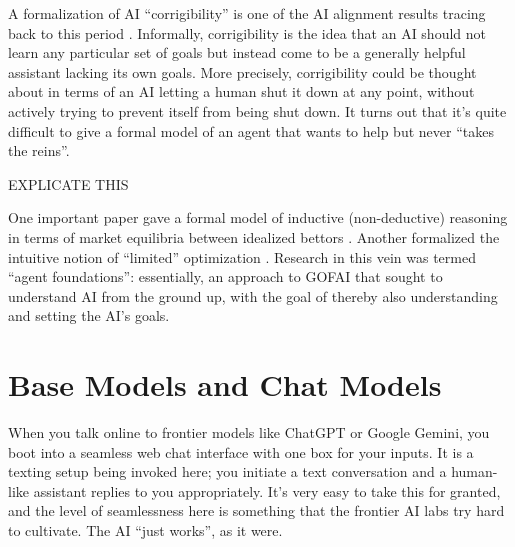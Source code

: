 A formalization of AI ``corrigibility'' is one of the AI alignment results
tracing back to this period \cite{soares2015corrigibility}. Informally,
corrigibility is the idea that an AI should not learn any particular set of
goals but instead come to be a generally helpful assistant lacking its own
goals. More precisely, corrigibility could be thought about in terms of an AI
letting a human shut it down at any point, without actively trying to prevent
itself from being shut down. It turns out that it's quite difficult to give a
formal model of an agent that wants to help but never ``takes the reins''.

EXPLICATE THIS

One important paper gave a formal model of inductive (non-deductive) reasoning
in terms of market equilibria between idealized bettors
\cite{garrabrant2020induction}. Another formalized the intuitive notion of
``limited'' optimization \cite{taylor2016quantilizers}. Research in this vein
was termed ``agent foundations'': essentially, an approach to GOFAI that sought
to understand AI from the ground up, with the goal of thereby also
understanding and setting the AI's goals.

\section{Base Models and Chat Models}
When you talk online to frontier models like ChatGPT or Google Gemini, you boot
into a seamless web chat interface with one box for your inputs. It is a
texting setup being invoked here; you initiate a text conversation and a
human-like assistant replies to you appropriately. It's very easy to take this
for granted, and the level of seamlessness here is something that the frontier
AI labs try hard to cultivate. The AI ``just works'', as it were.

